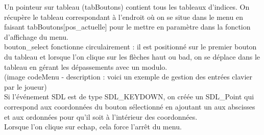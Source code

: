 \documentclass[11pt]{article}
\begin{document}
                    Un pointeur sur tableau (tabBoutons) contient tous les tableaux d’indices. On récupère le tableau correspondant à l’endroit où on se situe dans le menu en faisant tabBoutons[pos\_actuelle] pour le mettre en paramètre dans la fonction d’affichage du menu. \\
                    bouton\_select fonctionne circulairement : il est positionné sur le premier bouton du tableau et lorsque l’on clique sur les flèches haut ou bad, on se déplace dans le tableau en gérant les dépassements avec un modulo. \\
                    (image codeMenu - description : voici un exemple de gestion des entrées clavier par le joueur)\\
                    Si l’événement SDL est de type SDL\_KEYDOWN, on créée un SDL\_Point qui correspond aux coordonnées du bouton sélectionné en ajoutant un aux abscisses et aux ordonnées pour qu’il soit à l’intérieur des coordonnées. \\
                    Lorsque l’on clique sur echap, cela force l’arrêt du menu.
\end{document}
